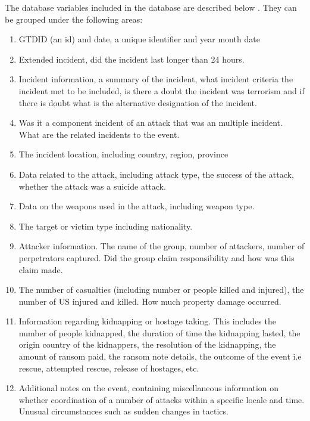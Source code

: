 The database variables included in the database are described below . They can be grouped under the following areas:
\begin{enumerate}
\item GTDID (an id) and date, a unique identifier and year month date
\item Extended incident, did the incident last longer than 24 hours.
\item Incident information, a summary of the incident, what incident criteria the incident met to be included, is there a doubt the incident was terrorism and if there is doubt what is the alternative designation of the incident. 
\item Was it a component incident of an attack that was an multiple incident. What are the related incidents to the event.
\item The incident location, including country, region, province 
\item  Data related to the attack, including attack type, the success of the attack, whether the attack was a suicide attack.
\item Data on the weapons used in the attack, including weapon type.
\item The target or victim type including nationality.
\item Attacker information. The name of the group, number of attackers, number of perpetrators captured. Did the group claim responsibility and how was this claim made.
\item The number of casualties (including number or people killed and injured), the number of US injured and killed. How much property damage occurred.
\item Information regarding kidnapping or hostage taking. This includes the number of people kidnapped, the duration of time the kidnapping lasted, the origin country of the kidnappers, the resolution of the kidnapping, the amount of ransom paid, the ransom note details, the outcome of the event i.e rescue, attempted rescue, release of hostages, etc.   
\item Additional notes on the event, containing miscellaneous information on whether coordination of a number of attacks within a specific locale and time. Unusual circumstances such as sudden changes in tactics.
\end{enumerate}

